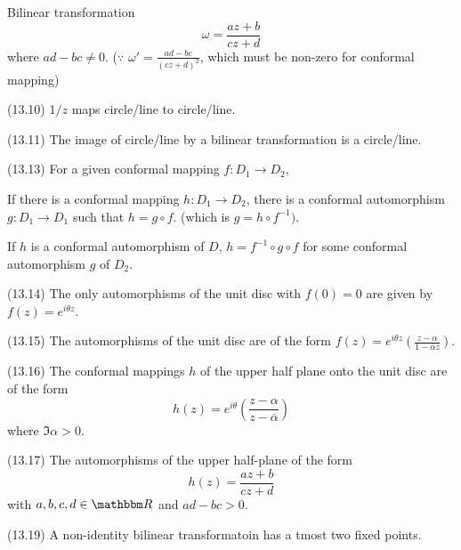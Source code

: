 \documentclass{article}
\begin{document}
\begin{definition}
  Bilinear transformation
  \[\omega = \frac{az + b}{cz + d}\]
  where \(ad - bc \neq 0\).
  (\(\because\) \(\omega' = \frac{ad - bc}{(cz + d)^2}\), which must be non-zero for conformal mapping)
\end{definition}

\begin{lemma}(13.10)
  \(1/z\) maps circle/line to circle/line.
\end{lemma}

\begin{theorem}(13.11)
  The image of circle/line by a bilinear transformation is a circle/line.
\end{theorem}

\begin{theorem}(13.13)
  For a given conformal mapping \(f: D_1 \to D_2\),

  If there is a conformal mapping \(h: D_1 \to D_2\),
  there is a conformal automorphism \(g: D_1 \to D_1\) such that \(h = g \circ f\). (which is \(g = h \circ f^{-1})\).

  If \(h\) is a conformal automorphism of \(D\),
  \(h = f^{-1} \circ g \circ f\) for some conformal automorphism \(g\) of \(D_2\).
\end{theorem}

\begin{lemma}(13.14)
  The only automorphisms of the unit disc with \(f(0) = 0\) are given by \(f(z) = e^{i\theta z}\).
\end{lemma}

\begin{theorem}(13.15)
  The automorphisms of the unit disc are of the form \(f(z) = e^{i\theta z} \left( \frac{z - \alpha}{1 - \overline{\alpha}{z}} \right)\).
\end{theorem}

\begin{theorem}(13.16)
  The conformal mappings \(h\) of the upper half plane onto the unit disc are of the form
  \[h(z) = e^{i\theta} \left(\frac{z - \alpha}{z-\overline\alpha}\right)\]
  where \(\Im \alpha > 0\).
\end{theorem}

\begin{theorem}(13.17)
  The automorphisms of the upper half-plane of the form
  \[h(z) = \frac{az + b}{cz + d}\]
  with \(a, b, c, d \in \bbR\) and \(ad - bc > 0\).
\end{theorem}

\begin{theorem}(13.19)
  A non-identity bilinear transformatoin has a tmost two fixed points.
\end{theorem}
\end{document}
